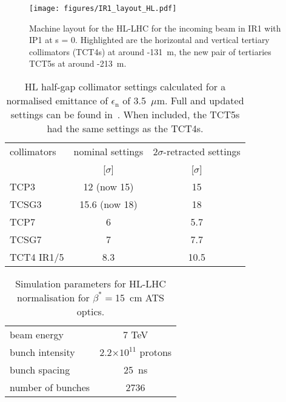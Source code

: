\begin{figure}%
\begin{center}
\texttt{[image: figures/IR1\_layout\_HL.pdf]}
\end{center}
\vspace{-0.6cm}
 \caption{Machine layout for the HL-LHC for the incoming beam in IR1 with IP1 at s = 0. Highlighted are the horizontal and vertical tertiary collimators (TCT4s) at around -131~m, the new pair of tertiaries TCT5s at around -213~m.
  \label{hllhc_layout}}
\end{figure}


 \begin{table}%
   \centering
   \caption{HL half-gap collimator settings calculated for a normalised emittance of $\epsilon_{\mathrm{n}}$ of 3.5~$\mu$m. Full and updated settings can be found in~\cite{collSettRef}. When included, the TCT5s had the same settings as the TCT4s.}

   \begin{tabular}{l|c|c}
       \hline
       collimators &        nominal settings & $2\sigma$-retracted settings\\
                   &         [$\sigma$] &  [$\sigma$]\\
       \hline
       TCP3 & 12 (now 15) & 15 \\
       TCSG3 & 15.6 (now 18)& 18 \\
       TCP7 & 6 & 5.7 \\
       TCSG7 & 7 & 7.7 \\
       TCT4 IR1/5 & 8.3 & 10.5 \\
       \hline
   \end{tabular}
   \label{HLcollSettings}
\end{table}

\begin{table}%
   \centering
   \caption{Simulation parameters for HL-LHC normalisation for $\beta^* =$15~cm ATS optics.}
   \begin{tabular}{l|c}
       \hline
       beam energy & 7 TeV \\
       bunch intensity & 2.2$\times 10^{11}$ protons\\
       bunch spacing & 25~ns \\
       number of bunches & 2736 \\
       \hline
   \end{tabular}
   \label{hlscenario}
\end{table}
